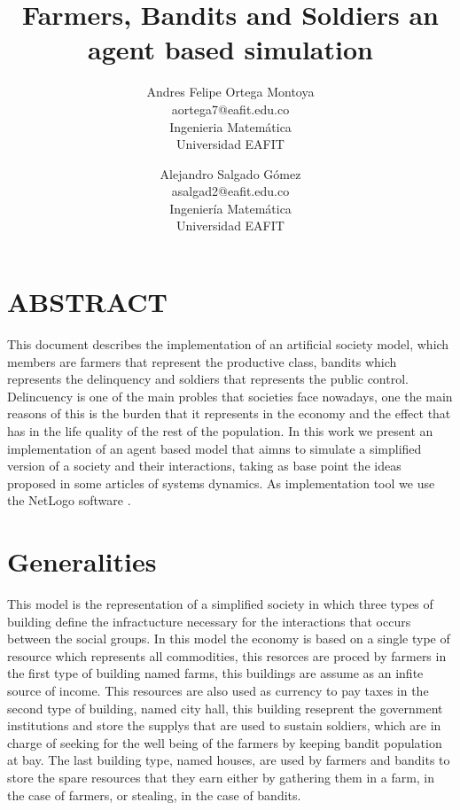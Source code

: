 \documentclass{wscpaperproc}
\theoremstyle{wsc}
\begin{document}

\title{Farmers, Bandits and Soldiers an agent based simulation}

\author{Andres Felipe Ortega Montoya\\ [12pt]
aortega7@eafit.edu.co\\
Ingenieria Matemática\\
Universidad EAFIT\\
\and
Alejandro Salgado Gómez\\[12pt]
asalgad2@eafit.edu.co\\
Ingeniería Matemática\\
Universidad EAFIT\\
}

\maketitle

\section*{ABSTRACT}

This document describes the implementation of an artificial society model, which members are
farmers that represent the productive class, bandits which represents the delinquency
and soldiers that represents the public control. Delincuency is one of the main probles that
societies face nowadays, one the main reasons of this is the burden that it represents in the
economy and the effect that has in the life quality of the rest of the population. In this work
we present an implementation of an agent based model that aimns to simulate a simplified version
of a society and their interactions, taking as base point the ideas proposed in some articles of
systems dynamics. As implementation tool we use the NetLogo software \cite{netlogo}.

\section{Generalities}

This model is the representation of a simplified society in which three types of building define
the infractucture necessary for the interactions that occurs between the social groups. In this model
the economy is based on a single type of resource which represents all commodities,
this resorces are proced by farmers in the first type of building named farms, this buildings
are assume as an infite source of income. This resources are also used as currency to pay taxes
in the second type of building, named city hall, this building reseprent the government institutions
and store the supplys that are used to sustain soldiers, which are in charge of seeking for the
well being of the farmers by keeping bandit population at bay. The last building type, named houses,
are used by farmers and bandits to store the spare resources that they earn either by gathering them
in a farm, in the case of farmers, or stealing, in the case of bandits.
\end{document}
